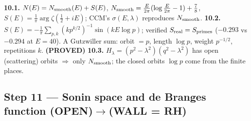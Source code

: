 \documentclass[11pt]{article}
\theoremstyle{remark}
\newcommand{\PROVED}{\textbf{(PROVED)}}
\newcommand{\OPEN}{\textbf{(OPEN)}}
\newcommand{\WALL}{\textbf{(WALL = RH)}}
\begin{document}
\textbf{10.1.} $N(E)=N_{\rm smooth}(E)+S(E)$,
$N_{\rm smooth}=\tfrac{E}{2\pi}(\log\tfrac{E}{2\pi}-1)+\tfrac78$,
$S(E)=\tfrac1\pi\arg\zeta(\tfrac12+iE)$; CCM's $\sigma(E,\lambda)$ reproduces $N_{\rm smooth}$.
\textbf{10.2.} $S(E)=-\tfrac1\pi\sum_{p,k}(kp^{k/2})^{-1}\sin(kE\log p)$; verified
$S_{\rm real}=S_{\rm primes}$ ($-0.293$ vs $-0.294$ at $E{=}40$). A Gutzwiller sum: orbit $=p$,
length $\log p$, weight $p^{-1/2}$, repetitions $k$. \PROVED
\textbf{10.3.} $H_\lambda=(p^2-\lambda^2)(q^2-\lambda^2)$ has open (scattering) orbits $\Rightarrow$
only $N_{\rm smooth}$; the closed orbits $\log p$ come from the finite places.

\subsection{Step 11 --- Sonin space and de Branges function \OPEN$\to$\WALL}
\end{document}
